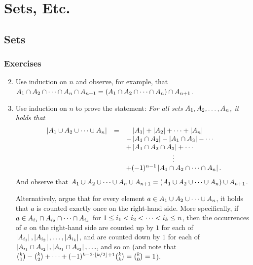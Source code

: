 \setcounter{chapter}{1}
\chapter{Sets, Etc.}
\section{Sets}
\subsection*{Exercises}
\begin{enumerate}[\thesection-1]
%
\setcounter{enumi}{1}
%
\item Use induction on $n$ and observe, for example, that $A_1 \cap A_2 \cap \cdots \cap A_n \cap A_{n + 1} = (A_1 \cap A_2 \cap \cdots \cap A_n) \cap A_{n + 1}$.
%
\item Use induction on $n$ to prove the statement: \emph{For all sets $A_1, A_2, \ldots, A_n$, it holds that
\[
\begin{array}{lll}
\card{A_1 \union A_2 \union \etc \union A_n} & = & \phantom{+} \card{A_1} + \card{A_2} + \etc + \card{A_n} \cr
 & & - \card{A_1 \intsc A_2} - \card{A_1 \intsc A_3} - \etc \cr
 & & + \card{A_1 \intsc A_2 \intsc A_3} + \etc \cr
 & & \multicolumn{1}{c}{\etv} \cr
 & & + (-1)^{n - 1} \card{A_1 \intsc A_2 \intsc \etc \intsc A_n}. \cr
\end{array}
\]}And observe that $A_1 \cup A_2 \cup \cdots \cup A_n \cup A_{n + 1} = (A_1 \cup A_2 \cup \cdots \cup A_n) \cup A_{n + 1}$.

Alternatively, argue that for every element $a \in A_1 \cup A_2 \cup \cdots \cup A_n$, it holds that $a$ is counted exactly once on the right-hand side. More specifically, if $a \in A_{i_1} \cap A_{i_2} \cap \cdots \cap A_{i_k}$ for $1 \leq i_1 < i_2 < \cdots < i_k \leq n$, then the occurrences of $a$ on the right-hand side are counted up by $1$ for each of $\left|A_{i_1}\right|, \left|A_{i_2}\right|, \ldots, \left|A_{i_k}\right|$, and are counted down by $1$ for each of $\left|A_{i_1} \cap A_{i_2}\right|, \left|A_{i_1} \cap A_{i_3}\right|, \ldots$, and so on (and note that ${k \choose 1} - {k \choose 2} + \cdots + (-1)^{k - 2 \cdot \left\lfloor k / 2\right\rfloor + 1} {k \choose k} = {k \choose 0} = 1$).
%
\end{enumerate}

